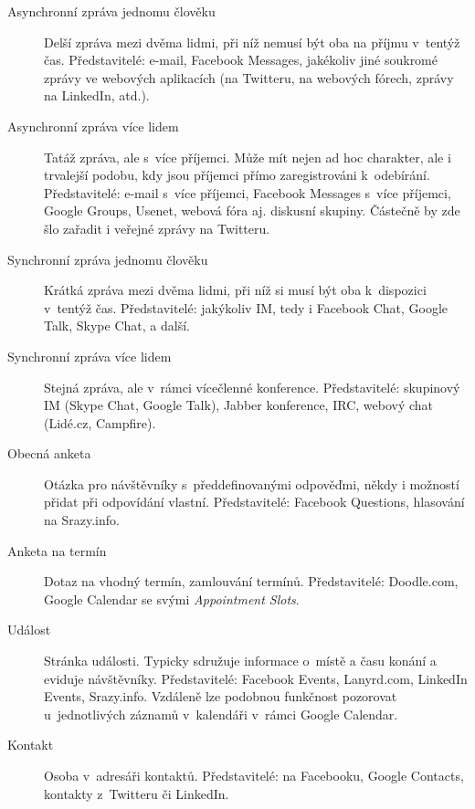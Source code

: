 \documentclass[12pt,oneside,final]{fithesis2}
\begin{document}
\begin{description}
    \item[Asynchronní zpráva jednomu člověku]
        Delší zpráva mezi dvěma lidmi, při níž nemusí být oba na příjmu v~tentýž čas. Představitelé: e-mail, Fa\-ce\-book Me\-ssa\-ges, jakékoliv jiné soukromé zprávy ve webových aplikacích (na Twitteru, na webových fórech, zprávy na LinkedIn, atd.).

    \item[Asynchronní zpráva více lidem]
        Tatáž zpráva, ale s~více příjemci. Může mít nejen ad hoc charakter, ale i trvalejší podobu, kdy jsou příjemci přímo zaregistrováni k~odebírání. Představitelé: e-mail s~více příjemci, Facebook Messages s~více příjemci, Google Groups, Usenet, webová fóra aj. diskusní skupiny. Částečně by zde šlo zařadit i veřejné zprávy na Twitteru.

    \item[Synchronní zpráva jednomu člověku]
        Krátká zpráva mezi dvěma lidmi, při níž si musí být oba k~dispozici v~tentýž čas. Představitelé: jakýkoliv IM, tedy i Facebook Chat, Google Talk, Skype Chat, a další.

    \item[Synchronní zpráva více lidem]
        Stejná zpráva, ale v~rámci vícečlenné konference. Představitelé: skupinový IM (Skype Chat, Google Talk), Jabber konference, IRC, webový chat (Lidé.cz, Campfire).

    \item[Obecná anketa]
        Otázka pro návštěvníky s~předdefinovanými odpověďmi, někdy i možností přidat při odpovídání vlastní. Představitelé: Facebook Questions, hlasování na Srazy.info.

    \item[Anketa na termín]
        Dotaz na vhodný termín, zamlouvání termínů. Představitelé: Doodle.com, Google Calendar se svými \emph{Appointment Slots}.

    \item[Událost]
        Stránka události. Typicky sdružuje informace o~místě a času konání a eviduje návštěvníky. Představitelé: Facebook Events, Lanyrd.com, LinkedIn Events, Srazy.info. Vzdáleně lze podobnou funkčnost pozorovat u~jednotlivých záznamů v~kalendáři v~rámci Google Calendar.

    \item[Kontakt]
        Osoba v~adresáři kontaktů. Představitelé:  na Facebooku, Google Contacts, kontakty z~Twitteru či LinkedIn.
\end{description}
\end{document}
